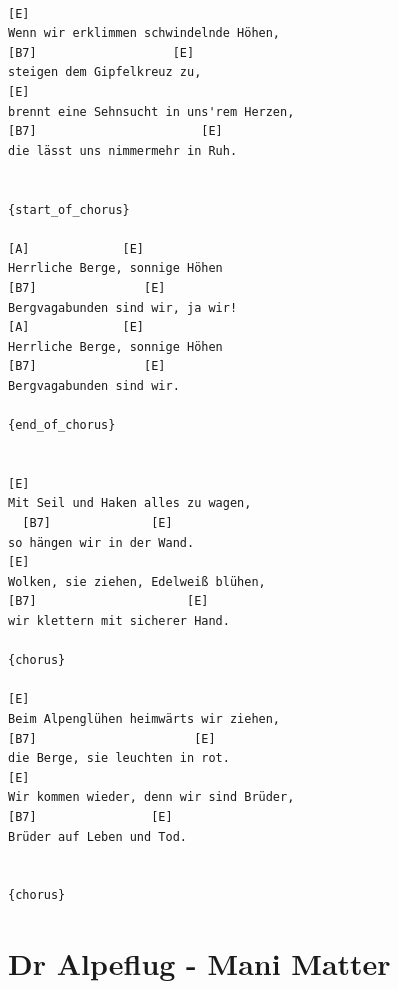 \documentclass[]{book}
\let\stdsection\section
\renewcommand\section{\clearpage\stdsection}
\begin{document}
\begin{verbatim}

[E]
Wenn wir erklimmen schwindelnde Höhen,
[B7]                   [E]
steigen dem Gipfelkreuz zu,
[E]
brennt eine Sehnsucht in uns'rem Herzen,
[B7]                       [E]
die lässt uns nimmermehr in Ruh.


{start_of_chorus}

[A]             [E]
Herrliche Berge, sonnige Höhen
[B7]               [E]
Bergvagabunden sind wir, ja wir!
[A]             [E]
Herrliche Berge, sonnige Höhen
[B7]               [E]
Bergvagabunden sind wir.

{end_of_chorus}


[E]      
Mit Seil und Haken alles zu wagen,
  [B7]              [E]
so hängen wir in der Wand.
[E]     
Wolken, sie ziehen, Edelweiß blühen,
[B7]                     [E]
wir klettern mit sicherer Hand.

{chorus}

[E]
Beim Alpenglühen heimwärts wir ziehen,
[B7]                      [E]
die Berge, sie leuchten in rot.
[E]                   
Wir kommen wieder, denn wir sind Brüder,
[B7]                [E]
Brüder auf Leben und Tod.


{chorus}
\end{verbatim}

\hypertarget{dr-alpeflug---mani-matter}{%
\section{Dr Alpeflug - Mani Matter}\label{dr-alpeflug---mani-matter}}
\end{document}
